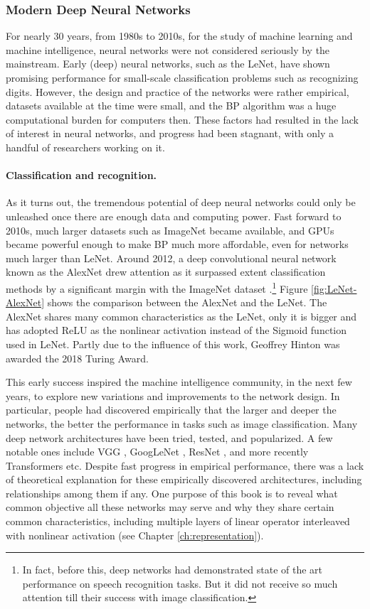 \documentclass[../../book-main.tex]{subfiles}
\begin{document}
\subsubsection{Modern Deep Neural Networks}
For nearly 30 years, from 1980s to 2010s, for the study of machine learning and machine intelligence, neural networks were not considered seriously by the mainstream. Early (deep) neural networks, such as the LeNet, have shown promising performance for small-scale classification problems such as recognizing digits. However, the design and practice of the networks were rather empirical, datasets available at the time were small, and the BP algorithm was a huge computational burden for computers then. These factors had resulted in the lack of interest in neural networks, and progress had been stagnant, with only a handful of researchers working on it. 

\paragraph{Classification and recognition.}
As it turns out, the tremendous potential of deep neural networks could only be unleashed once there are enough data and computing power. Fast forward to 2010s, much larger datasets such as ImageNet became available, and GPUs became powerful enough to make BP much more affordable, even for networks much larger than LeNet. Around 2012, a deep convolutional neural network known as the AlexNet drew attention as it surpassed extent classification methods by a significant margin with the ImageNet dataset \cite{krizhevsky2012imagenet}.\footnote{In fact, before this, deep networks had demonstrated state of the art performance on speech recognition tasks. But it did not receive so much attention till their success with image classification.} Figure \ref{fig:LeNet-AlexNet} shows the comparison between the AlexNet and the LeNet. The AlexNet shares many common characteristics as the LeNet, only it is bigger and has adopted ReLU as the nonlinear activation instead of the Sigmoid function used in LeNet. Partly due to the influence of this work, Geoffrey Hinton was awarded the 2018 Turing Award.


This early success inspired the machine intelligence community, in the next few years, to explore new variations and improvements to the network design. In particular, people had discovered empirically that the larger and deeper the networks, the better the performance in tasks such as image classification. Many deep network architectures have been tried, tested, and popularized. A few notable ones include VGG \cite{Simonyan15}, GoogLeNet \cite{Szegedy2014GoingDW}, ResNet \cite{He2016-lc}, and more recently Transformers \cite{vaswani2017attention} etc. Despite fast progress in empirical performance, there was a lack of theoretical explanation for these empirically discovered architectures, including relationships among them if any. One purpose of this book is to reveal what common objective all these networks may serve and why they share certain common characteristics, including multiple layers of linear operator interleaved with nonlinear activation (see Chapter \ref{ch:representation}). 
\end{document}
